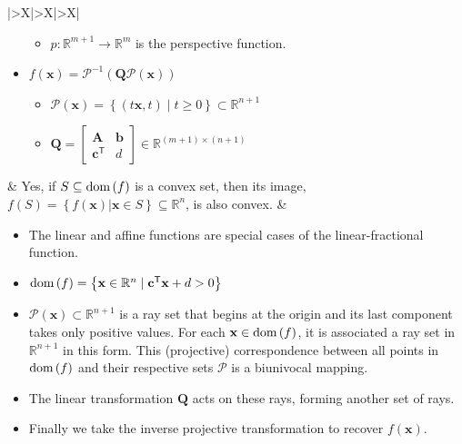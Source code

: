 \documentclass{article}
\newcommand{\dom}[1]{\ensuremath{\textnormal{dom}\left(#1\right)}} %
\begin{document}
\begin{xltabular}{\textwidth}{|>{\setlength\hsize{1\hsize}\setlength\linewidth{\hsize}}X|>{\setlength\hsize{.9\hsize}\setlength\linewidth{\hsize}}X|>{\setlength\hsize{1.1\hsize}\setlength\linewidth{\hsize}}X|}
\begin{itemize}[leftmargin=*]
\begin{itemize}[label={$\triangleright$}]
			      \item \(p: \mathbb{R}^{m+1} \rightarrow \mathbb{R}^{m}\) is the perspective function.
		      \end{itemize}
		\item \(f(\mathbf{x}) = \mathcal{P}^{-1}(\mathbf{Q}\mathcal{P}(\mathbf{x}))\)
		      \begin{itemize}[label={$\triangleright$}]
			      \item \(\mathcal{P}(\mathbf{x}) = \left\{ (t\mathbf{x}, t) \mid t \geq 0 \right\} \subset \mathbb{R}^{n+1}\)
			      \item \(\mathbf{Q} = \begin{bmatrix}
				            \mathbf{A}            & \mathbf{b} \\
				            \mathbf{c}^\mathsf{T} & d
			            \end{bmatrix} \in \mathbb{R}^{(m+1)\times(n+1)}\)
		      \end{itemize}
	\end{itemize} & Yes, if \(S \subseteq \dom{f}\) is a convex set, then its image, \(f(S) = \left\{ f(\mathbf{x})|\mathbf{x}\in S \right\} \subseteq \mathbb{R}^{n}\), is also convex. & \vspace{-3.5ex} \begin{itemize}[leftmargin=*]
		\item The linear and affine functions are special cases of the linear-fractional function.
		\item \(\dom{f} = \left\{ \mathbf{x} \in \mathbb{R}^{n} \mid \mathbf{c}^\mathsf{T} \mathbf{x} + d > 0 \right\}\)
		\item \(\mathcal{P}(\mathbf{x}) \subset \mathbb{R}^{n+1}\) is a ray set that begins at the origin and its last component takes only positive values. For each \(\mathbf{x} \in \dom{f}\), it is associated a ray set in \(\mathbb{R}^{n+1}\) in this form. This (projective) correspondence between all points in \(\dom{f}\) and their respective sets \(\mathcal{P}\) is a biunivocal mapping.
		\item The linear transformation \(\mathbf{Q}\) acts on these rays, forming another set of rays.
		\item Finally we take the inverse projective transformation to recover \(f(\mathbf{x})\).
	\end{itemize}\\
	\hline
\end{xltabular}
\end{document}
